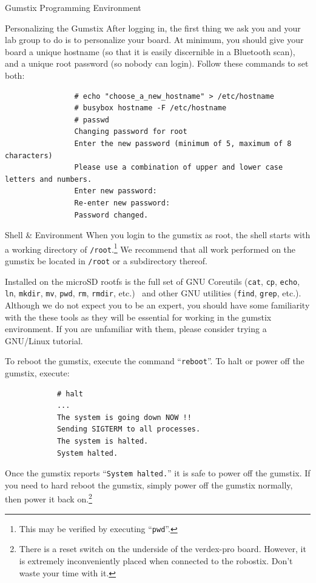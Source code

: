 \documentclass{article}
\begin{document}
\begin{section}{Gumstix Programming Environment}
		\begin{subsection}{Personalizing the Gumstix} \label{mylinux}
			After logging in, the first thing we ask you and your lab group
			to do is to personalize your board.  At minimum, you should give your board
			a unique hostname (so that it is easily discernible in a Bluetooth scan),
			and a unique root password (so nobody can login).  Follow these commands to
			set both:
			\begin{verbatim}
				# echo "choose_a_new_hostname" > /etc/hostname
				# busybox hostname -F /etc/hostname
				# passwd
				Changing password for root
				Enter the new password (minimum of 5, maximum of 8 characters)
				Please use a combination of upper and lower case letters and numbers.
				Enter new password:
				Re-enter new password:
				Password changed.
			\end{verbatim}
		\end{subsection}

		\begin{subsection}{Shell \& Environment}
			When you login to the gumstix as root, the shell starts with a working
			directory of \texttt{/root}.\footnote{This may be verified by executing
			``\texttt{pwd}''.}  We recommend that all work performed on the gumstix be
			located in \texttt{/root} or a subdirectory thereof.

			Installed on the microSD rootfs is the full set of GNU Coreutils (\texttt{cat},
			\texttt{cp}, \texttt{echo}, \texttt{ln}, \texttt{mkdir}, \texttt{mv},
			\texttt{pwd}, \texttt{rm}, \texttt{rmdir}, etc.)~\cite{FSF:GNUCoreutils}
			and other GNU utilities (\texttt{find}, \texttt{grep}, etc.).  Although we
			do not expect you to be an expert, you should have some familiarity with
			the these tools as they will be essential for working in the gumstix
			environment.  If you are unfamiliar with them, please consider trying a
			GNU/Linux tutorial.

			To reboot the gumstix, execute the command ``\verb|reboot|''.  To halt or
			power off the gumstix, execute:
			\begin{verbatim}
			# halt
			...
			The system is going down NOW !!
			Sending SIGTERM to all processes.
			The system is halted.
			System halted.
			\end{verbatim}
			Once the gumstix reports ``\verb|System halted.|'' it is safe to power off
			the gumstix.  If you need to hard reboot the gumstix, simply power off the
			gumstix normally, then power it back on.\footnote{There is a reset switch
			on the underside of the verdex-pro board.  However, it is extremely
			inconveniently placed when connected to the robostix.  Don't waste your
			time with it.}
		\end{subsection}


\end{section}
\end{document}
